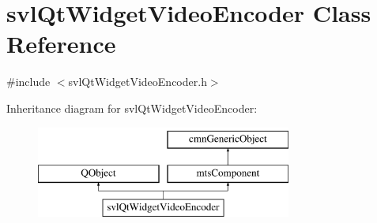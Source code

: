 \hypertarget{classsvl_qt_widget_video_encoder}{\section{svl\-Qt\-Widget\-Video\-Encoder Class Reference}
\label{classsvl_qt_widget_video_encoder}
}


{\ttfamily \#include $<$svl\-Qt\-Widget\-Video\-Encoder.\-h$>$}

Inheritance diagram for svl\-Qt\-Widget\-Video\-Encoder\-:\begin{figure}[H]
\begin{center}
\leavevmode
\includegraphics[height=3.000000cm]{d8/da0/classsvl_qt_widget_video_encoder}
\end{center}
\end{figure}
